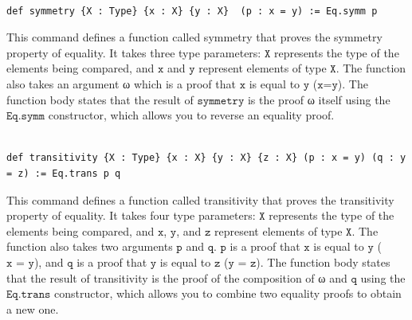 \documentclass{book}
\theoremstyle{definition}
\newcounter{lcounter}
\begin{document}
\begin{center}
\begin{tcolorbox}[width=5in,colback={white},title={\begin{center}\texttt{Lean \thelcounter} \addtocounter{lcounter}{1}  \end{center}},colbacktitle=Blue,coltitle=black]
\begin{verbatim}

def symmetry {X : Type} {x : X} {y : X}  (p : x = y) := Eq.symm p

\end{verbatim}
\end{tcolorbox}
\end{center}

This command defines a function called symmetry that proves the symmetry property of equality. It takes three type parameters: $\texttt{X}$ represents the type of the elements being compared, and $\texttt{x}$ and $\texttt{y}$ represent elements of type $\texttt{X}$. The function also takes an argument ω which is a proof that $\texttt{x}$ is equal to $\texttt{y}$ ($\texttt{x=y}$). The function body states that the result of $\texttt{symmetry}$ is the proof ω itself using the $\texttt{Eq.symm}$ constructor, which allows you to reverse an equality proof.

\begin{center}
\begin{tcolorbox}[width=5in,colback={white},title={\begin{center}\texttt{Lean \thelcounter} \addtocounter{lcounter}{1}  \end{center}},colbacktitle=Blue,coltitle=black]
\begin{verbatim}

def transitivity {X : Type} {x : X} {y : X} {z : X} (p : x = y) (q : y = z) := Eq.trans p q

\end{verbatim}
\end{tcolorbox}
\end{center}

This command defines a function called transitivity that proves the transitivity property of equality. It takes four type parameters: $\texttt{X}$ represents the type of the elements being compared, and $\texttt{x}$, $\texttt{y}$, and $\texttt{z}$ represent elements of type $\texttt{X}$. The function also takes two arguments $\texttt{p}$ and $\texttt{q}$. $\texttt{p}$ is a proof that $\texttt{x}$ is equal to $\texttt{y}$ ($\texttt{x = y}$), and $\texttt{q}$ is a proof that $\texttt{y}$ is equal to $\texttt{z}$ ($\texttt{y = z}$). The function body states that the result of transitivity is the proof of the composition of ω and $\texttt{q}$ using the $\texttt{Eq.trans}$ constructor, which allows you to combine two equality proofs to obtain a new one.\\
\end{document}
